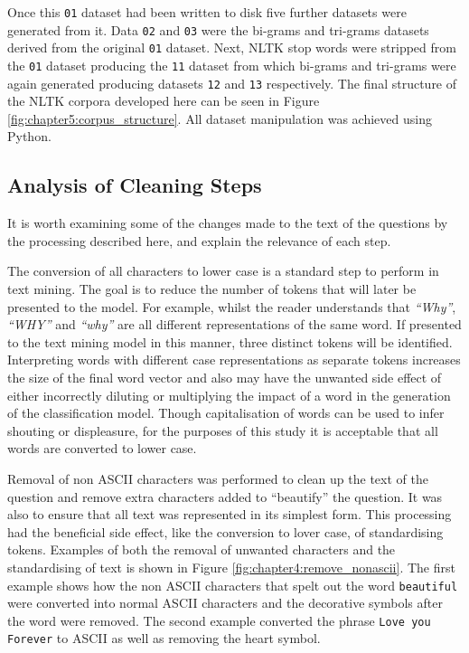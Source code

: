 Once this \verb|01| dataset had been written to disk five further datasets were generated from it. Data \verb|02| and \verb|03| were the bi-grams and tri-grams datasets derived from the original \verb|01| dataset. Next, NLTK stop words were stripped from the \verb|01| dataset producing the \verb|11| dataset from which bi-grams and tri-grams were again generated producing datasets \verb|12| and \verb|13| respectively. The final structure of the NLTK corpora developed here can be seen in Figure \ref{fig:chapter5:corpus_structure}. All dataset manipulation was achieved using Python.

\subsection{Analysis of Cleaning Steps}

It is worth examining some of the changes made to the text of the questions by the processing described here, and explain the relevance of each step.

The conversion of all characters to lower case is a standard step to perform in text mining. The goal is to reduce the number of tokens that will later be presented to the model. For example, whilst the reader understands that \textit{``Why''}, \textit{``WHY''} and \textit{``why''} are all different representations of the same word. If presented to the text mining model in this manner, three distinct tokens will be identified. Interpreting words with different case representations as separate tokens increases the  size of the final word vector and also may have the unwanted side effect of either incorrectly diluting or multiplying the impact of a word in the generation of the classification model. Though capitalisation of words can be used to infer shouting or displeasure, for the purposes of this study it is acceptable that all words are converted to lower case.

Removal of non ASCII characters was performed to clean up the text of the question and remove extra characters added to ``beautify'' the question. It was also to ensure that all text was represented in its simplest form. This processing had the beneficial side effect, like the conversion to lover case, of standardising tokens. Examples of both the removal of unwanted characters and the standardising of text is shown in Figure \ref{fig:chapter4:remove_nonascii}. The first example shows how the non ASCII characters that spelt out the word \verb|beautiful| were converted into normal ASCII characters and the decorative symbols after the word were removed. The second example converted the phrase \verb|Love you Forever| to ASCII as well as removing the heart symbol.

